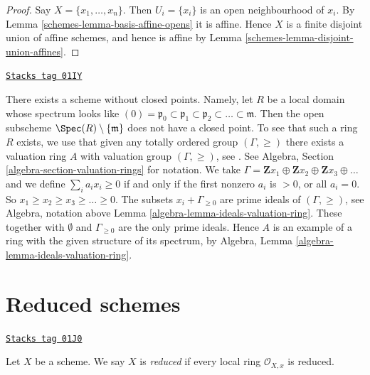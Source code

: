 \begin{proof}

Say $X = \{x_1, \ldots, x_n\}$. Then $U_i = \{x_i\}$ is an open neighbourhood
of $x_i$. By
Lemma \ref{schemes-lemma-basis-affine-opens}
it is affine. Hence $X$ is a finite disjoint union of affine schemes, and
hence is affine by
Lemma \ref{schemes-lemma-disjoint-union-affines}.
\end{proof}

\begin{example}
\label{schemes-example-scheme-without-closed-points}
\href{https://stacks.math.columbia.edu/tag/01IY}{\texttt{Stacks tag 01IY}}

There exists a scheme without closed points.
Namely, let $R$ be a local domain whose spectrum
looks like
$(0) = \mathfrak p_0 \subset \mathfrak p_1 \subset \mathfrak p_2
\subset \ldots \subset \mathfrak m$. Then the open subscheme
$\Spec(R) \setminus \{\mathfrak m\}$ does not have
a closed point. To see that such a ring $R$ exists, we use
that given any totally ordered group $(\Gamma, \geq)$
there exists a valuation ring $A$ with valuation group $(\Gamma, \geq)$,
see \cite{Krull}. See Algebra, Section \ref{algebra-section-valuation-rings}
for notation. We take
$\Gamma = \mathbf{Z}x_1 \oplus \mathbf{Z}x_2 \oplus \mathbf{Z}x_3 \oplus
\ldots$ and we define $\sum_i a_i x_i \geq 0$ if and only
if the first nonzero $a_i$ is $> 0$, or all $a_i = 0$.
So $x_1 \geq x_2 \geq x_3 \geq  \ldots \geq 0$.
The subsets $x_i + \Gamma_{\geq 0}$ are prime ideals
of $(\Gamma, \geq)$, see Algebra, notation above
Lemma \ref{algebra-lemma-ideals-valuation-ring}. These together
with $\emptyset$ and $\Gamma_{\geq 0}$ are the only prime ideals.
Hence $A$ is an example of a ring with the given structure of
its spectrum, by
Algebra, Lemma \ref{algebra-lemma-ideals-valuation-ring}.
\end{example}

\section{Reduced schemes}
\label{schemes-section-reduced}
\begin{definition}[Reduced]
\label{schemes-definition-reduced}
\href{https://stacks.math.columbia.edu/tag/01J0}{\texttt{Stacks tag 01J0}}

Let $X$ be a scheme. We say $X$ is {\it reduced} if every local ring
$\mathcal{O}_{X, x}$ is reduced.
\end{definition}

